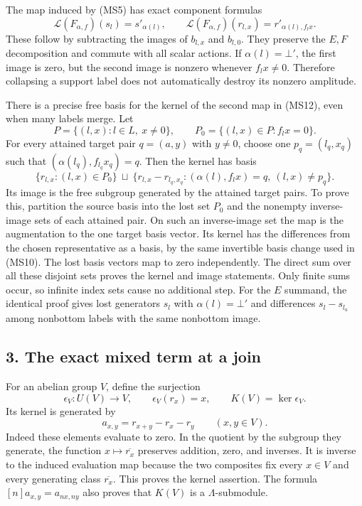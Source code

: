 \documentclass[
]{article}
\begin{document}
The map induced by (MS5) has exact component formulas \[
\mathscr L(F_{\alpha,f})(s_l)=s'_{\alpha(l)},
\qquad
\mathscr L(F_{\alpha,f})(r_{l,x})=r'_{\alpha(l),f_lx}.
\tag{MS12}
\] These follow by subtracting the images of \(b_{l,x}\) and
\(b_{l,0}\). They preserve the \(E,F\) decomposition and commute with
all scalar actions. If \(\alpha(l)=\bot'\), the first image is zero, but
the second image is nonzero whenever \(f_lx\ne0\). Therefore collapsing
a support label does not automatically destroy its nonzero amplitude.

There is a precise free basis for the kernel of the second map in
(MS12), even when many labels merge. Let \[
P=\{(l,x):l\in L,\ x\ne0\},\qquad
P_0=\{(l,x)\in P:f_lx=0\}.
\tag{MS13}
\] For every attained target pair \(q=(a,y)\) with \(y\ne0\), choose one
\(p_q=(l_q,x_q)\) such that \((\alpha(l_q),f_{l_q}x_q)=q\). Then the
kernel has basis \[
\{r_{l,x}:(l,x)\in P_0\}
\ \sqcup\
\{r_{l,x}-r_{l_q,x_q}:
 (\alpha(l),f_lx)=q,\ (l,x)\ne p_q\}.
\tag{MS14}
\] Its image is the free subgroup generated by the attained target
pairs. To prove this, partition the source basis into the lost set
\(P_0\) and the nonempty inverse-image sets of each attained pair. On
such an inverse-image set the map is the augmentation to the one target
basis vector. Its kernel has the differences from the chosen
representative as a basis, by the same invertible basis change used in
(MS10). The lost basis vectors map to zero independently. The direct sum
over all these disjoint sets proves the kernel and image statements.
Only finite sums occur, so infinite index sets cause no additional step.
For the \(E\) summand, the identical proof gives lost generators \(s_l\)
with \(\alpha(l)=\bot'\) and differences \(s_l-s_{l_a}\) among nonbottom
labels with the same nonbottom image.

\subsection{3. The exact mixed term at a
join}\label{the-exact-mixed-term-at-a-join}

For an abelian group \(V\), define the surjection \[
\epsilon_V:U(V)\to V,\qquad \epsilon_V(r_x)=x,
\qquad K(V)=\ker\epsilon_V.
\tag{MS15}
\] Its kernel is generated by \[
a_{x,y}=r_{x+y}-r_x-r_y\qquad(x,y\in V).
\tag{MS16}
\] Indeed these elements evaluate to zero. In the quotient by the
subgroup they generate, the function \(x\mapsto\overline{r_x}\)
preserves addition, zero, and inverses. It is inverse to the induced
evaluation map because the two composites fix every \(x\in V\) and every
generating class \(\overline{r_x}\). This proves the kernel assertion.
The formula \([n]a_{x,y}=a_{nx,ny}\) also proves that \(K(V)\) is a
\(\Lambda\)-submodule.
\end{document}

